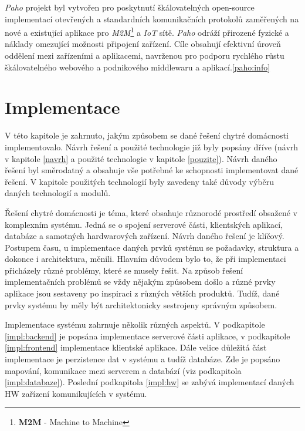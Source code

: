 \emph{Paho} projekt byl vytvořen pro poskytnutí škálovatelných open-source implementací otevřených a standardních komunikačních protokolů zaměřených na nové a
existující aplikace pro \emph{M2M}\footnote{\textbf{M2M} - Machine to Machine} a \emph{IoT} sítě.
\emph{Paho} odráží přirozené fyzické a náklady omezující možnosti připojení zařízení.
Cíle obsahují efektivní úroveň oddělení mezi zařízeními a aplikacemi, navrženou pro podporu rychlého růstu škálovatelného webového a podnikového middlewaru a aplikací.\ref{paho:info}

\chapter{Implementace}
\label{impl}
V této kapitole je zahrnuto, jakým způsobem se dané řešení chytré domácnosti implementovalo.
Návrh řešení a použité technologie již byly popsány dříve (návrh v kapitole \ref{navrh} a použité technologie v kapitole \ref{pouzite}).
Návrh daného řešení byl směrodatný a obsahuje vše potřebné ke schopnosti implementovat dané řešení.
V kapitole použitých technologií byly zavedeny také důvody výběru daných technologií a modulů.

Řešení chytré domácnosti je téma, které obsahuje různorodé prostředí obsažené v komplexním systému.
Jedná se o spojení serverové části, klientských aplikací, databáze a samotných hardwarových zařízení.
Návrh daného řešení je klíčový.
Postupem času, u implementace daných prvků systému se požadavky, struktura a dokonce i architektura, měnili.
Hlavním důvodem bylo to, že při implementaci přicházely různé problémy, které se musely řešit.
Na způsob řešení implementačních problémů se vždy nějakým způsobem došlo a různé prvky aplikace jsou sestaveny po inspiraci z různých větších produktů.
Tudíž, dané prvky systému by měly být architektonicky sestrojeny správným způsobem.

Implementace systému zahrnuje několik různých aspektů.
V podkapitole \ref{impl:backend} je popsána implementace serverové části aplikace, v podkapitole \ref{impl:frontend} implementace klientské aplikace.
Dále velice důležitá část implementace je perzistence dat v systému a tudíž databáze. Zde je popsáno mapování, komunikace mezi serverem a databází (viz podkapitola \ref{impl:databaze}).
Poslední podkapitola \ref{impl:hw} se zabývá implementací daných HW zařízení komunikujících v systému.

